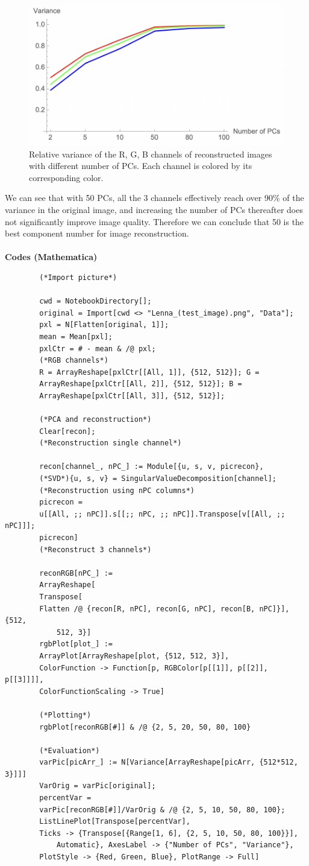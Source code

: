 \documentclass[11pt]{article}
\def \bold {\textbf}
\begin{document}
	\begin{figure}[H] %
		\centering\includegraphics[width=0.6\linewidth]{prob4_eval.png}
		\caption{Relative variance of the R, G, B channels of reconstructed images with different number of PCs. Each channel is colored by its corresponding color.} %
		\label{fig:fig4}  %
	\end{figure}

	We can see that with 50 PCs, all the 3 channels effectively reach over 90\% of the variance in the original image, and increasing the number of PCs thereafter does not significantly improve image quality. Therefore we can conclude that 50 is the best component number for image reconstruction. 
		\\ \\
	\bold{Codes (Mathematica)}
	\begin{verbatim}
		(*Import picture*)
		
		cwd = NotebookDirectory[];
		original = Import[cwd <> "Lenna_(test_image).png", "Data"];
		pxl = N[Flatten[original, 1]];
		mean = Mean[pxl];
		pxlCtr = # - mean & /@ pxl;
		(*RGB channels*)
		R = ArrayReshape[pxlCtr[[All, 1]], {512, 512}]; G = 
		ArrayReshape[pxlCtr[[All, 2]], {512, 512}]; B = 
		ArrayReshape[pxlCtr[[All, 3]], {512, 512}];
		
		(*PCA and reconstruction*)
		Clear[recon];
		(*Reconstruction single channel*)
		
		recon[channel_, nPC_] := Module[{u, s, v, picrecon},
		(*SVD*){u, s, v} = SingularValueDecomposition[channel];
		(*Reconstruction using nPC columns*)
		picrecon = 
		u[[All, ;; nPC]].s[[;; nPC, ;; nPC]].Transpose[v[[All, ;; nPC]]];
		picrecon]
		(*Reconstruct 3 channels*)
		
		reconRGB[nPC_] := 
		ArrayReshape[
		Transpose[
		Flatten /@ {recon[R, nPC], recon[G, nPC], recon[B, nPC]}], {512, 
			512, 3}]
		rgbPlot[plot_] := 
		ArrayPlot[ArrayReshape[plot, {512, 512, 3}], 
		ColorFunction -> Function[p, RGBColor[p[[1]], p[[2]], p[[3]]]], 
		ColorFunctionScaling -> True]
		
		(*Plotting*)
		rgbPlot[reconRGB[#]] & /@ {2, 5, 20, 50, 80, 100}
		
		(*Evaluation*)
		varPic[picArr_] := N[Variance[ArrayReshape[picArr, {512*512, 3}]]]
		VarOrig = varPic[original];
		percentVar = 
		varPic[reconRGB[#]]/VarOrig & /@ {2, 5, 10, 50, 80, 100};
		ListLinePlot[Transpose[percentVar], 
		Ticks -> {Transpose[{Range[1, 6], {2, 5, 10, 50, 80, 100}}], 
			Automatic}, AxesLabel -> {"Number of PCs", "Variance"}, 
		PlotStyle -> {Red, Green, Blue}, PlotRange -> Full]
	\end{verbatim}
	
	
\end{document}
